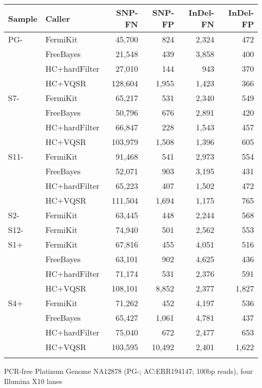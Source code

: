 \documentclass{bioinfo}
\begin{document}
\begin{table}[t]
{\footnotesize
\begin{tabular}{lp{1.7cm}rrrr}
\toprule
Sample & Caller     & SNP-FN & SNP-FP & InDel-FN & InDel-FP \\
\midrule
PG- & FermiKit      & 45,700 & 824    & 2,324    & 472 \\
	& FreeBayes     & 21,548 & 439    & 3,858    & 400 \\
    & HC+hardFilter & 27,010 & 144    & 943      & 370 \\
	& HC+VQSR       & 128,604& 1,955  & 1,423    & 366 \\
S7- & FermiKit      & 65,217 & 531    & 2,340    & 549 \\
	& FreeBayes     & 50,796 & 676    & 2,891    & 420 \\
    & HC+hardFilter & 66,847 & 228    & 1,543    & 457 \\
	& HC+VQSR       & 103,979& 1,508  & 1,396    & 605 \\
S11-& FermiKit      & 91,468 & 541    & 2,973    & 554 \\
	& FreeBayes     & 52,071 & 903    & 3,195    & 431 \\
	& HC+hardFilter & 65,223 & 407    & 1,502    & 472 \\
	& HC+VQSR       & 111,504& 1,694  & 1,175    & 765 \\
S2- & FermiKit      & 63,445 & 448    & 2,244    & 568 \\
S12-& FermiKit      & 74,940 & 501    & 2,562    & 553 \\
S1+ & FermiKit      & 67,816 & 455    & 4,051    & 516 \\
	& FreeBayes     & 63,101 & 902    & 4,625    & 436 \\
    & HC+hardFilter & 71,174 & 531    & 2,376    & 591 \\
	& HC+VQSR       & 108,101& 8,852  & 2,377    & 1,827 \\
S4+ & FermiKit      & 71,262 & 452    & 4,197    & 536 \\
	& FreeBayes     & 65,427 & 1,061  & 4,781    & 437 \\
	& HC+hardFilter & 75,040 & 672    & 2,477    & 653 \\
	& HC+VQSR       & 103,595& 10,492 & 2,401    & 1,622 \\
\botrule
\end{tabular}}{PCR-free Platinum Genome NA12878 (PG-; AC:ERR194147; 100bp reads), four Illumina X10 lanes
}
\end{table}
\end{document}
